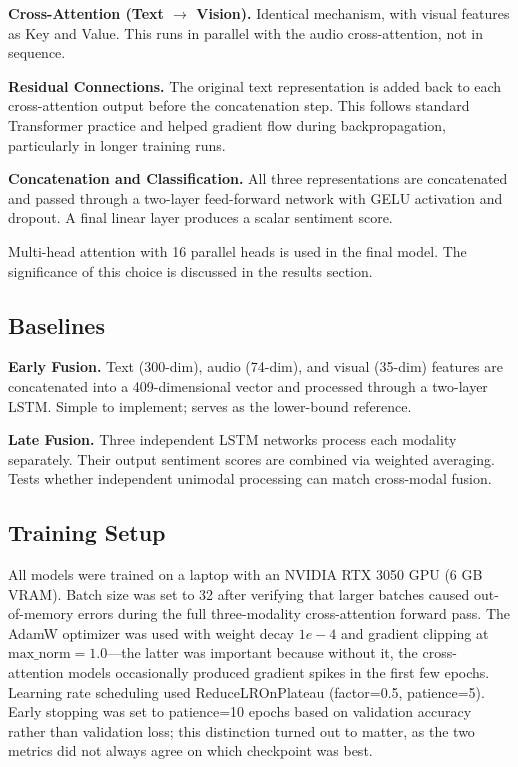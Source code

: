 \documentclass[conference]{IEEEtran}
\begin{document}
\textbf{Cross-Attention (Text $\to$ Vision).} Identical mechanism, with visual features as Key and Value. This runs in parallel with the audio cross-attention, not in sequence.

\textbf{Residual Connections.} The original text representation is added back to each cross-attention output before the concatenation step. This follows standard Transformer practice and helped gradient flow during backpropagation, particularly in longer training runs.

\textbf{Concatenation and Classification.} All three representations are concatenated and passed through a two-layer feed-forward network with GELU activation and dropout. A final linear layer produces a scalar sentiment score.

Multi-head attention with 16 parallel heads is used in the final model. The significance of this choice is discussed in the results section.

\subsection{Baselines}

\textbf{Early Fusion.} Text (300-dim), audio (74-dim), and visual (35-dim) features are concatenated into a 409-dimensional vector and processed through a two-layer LSTM. Simple to implement; serves as the lower-bound reference.

\textbf{Late Fusion.} Three independent LSTM networks process each modality separately. Their output sentiment scores are combined via weighted averaging. Tests whether independent unimodal processing can match cross-modal fusion.

\subsection{Training Setup}

All models were trained on a laptop with an NVIDIA RTX 3050 GPU (6 GB VRAM). Batch size was set to 32 after verifying that larger batches caused out-of-memory errors during the full three-modality cross-attention forward pass. The AdamW optimizer was used with weight decay $1e-4$ and gradient clipping at $\text{max\_norm} = 1.0$---the latter was important because without it, the cross-attention models occasionally produced gradient spikes in the first few epochs. Learning rate scheduling used ReduceLROnPlateau (factor=0.5, patience=5). Early stopping was set to patience=10 epochs based on validation accuracy rather than validation loss; this distinction turned out to matter, as the two metrics did not always agree on which checkpoint was best.
\end{document}
